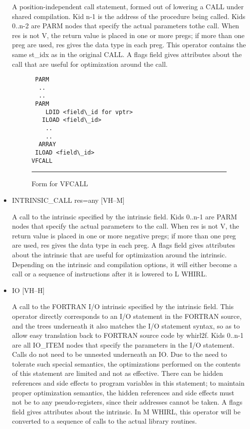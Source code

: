 \documentclass{article}
\begin{document}
\begin{itemize}
A position-independent call statement, formed out of lowering a
CALL under shared compilation. Kid n-1 is the address of the
procedure being
called. Kids 0..n-2 are
%
PARM nodes that specify the actual parameters
tothe call. When res is not V, the return value is placed in one
or more pregs; if more than one preg are used, res gives the data type in
each preg. This operator contains the same st\_idx as in the original
CALL. A flags field gives attributes about the call that are useful
for optimization around the call. 

\begin{figure}
\begin{center}
\begin{minipage}{4in}
%
%
%
%
\begin{verbatim}
 PARM
  ..
  ..
 PARM
    LDID <field\_id for vptr>
   ILOAD <field\_id> 
    ..
    ..
  ARRAY
 ILOAD <field\_id> 
VFCALL
\end{verbatim}
\end{minipage}
\end{center}
\hrule
\caption{Form for VFCALL}
\label{vfcall-form}
\end{figure}


%
\item  INTRINSIC\_CALL res=any  \hfill [VH--M]

A call to the intrinsic specified by the intrinsic field. Kids
0..n-1 are
%
PARM nodes that specify the actual parameters to the
call. When res is not V, the return value is placed in one or more
negative pregs; if more
than one preg are used, res gives the data type in each preg. A
flags field gives attributes about the intrinsic that are useful
for optimization around the intrinsic. Depending on the intrinsic
and compilation options, it will either become a call or a sequence
of instructions after it is lowered to L WHIRL. 

\item
{}%
IO \hfill [VH--H]

A call to the FORTRAN I/O intrinsic specified by the intrinsic
field. This operator directly corresponds to an I/O statement in
the FORTRAN
source, and the trees underneath it also matches the I/O statement
syntax, so as to allow easy translation back to FORTRAN source code
by whirl2f. Kids 0..n-1 are all
%
IO\_ITEM nodes that specify the
parameters in the I/O statement. Calls do not need to be unnested
underneath an
%
IO. Due to the need to tolerate such special semantics, the
optimizations performed on the contents of this statement are
limited and not as effective. There can be hidden references and
side effects to program variables in this statement; to maintain
proper optimization semantics, the hidden references and side
effects must not be to any pseudo-registers, since their addresses
cannot be taken. A flags field gives attributes about the intrinsic.
In M WHIRL, this operator will be converted to a sequence of calls
to the actual library routines. 


\end{itemize}
\end{document}
